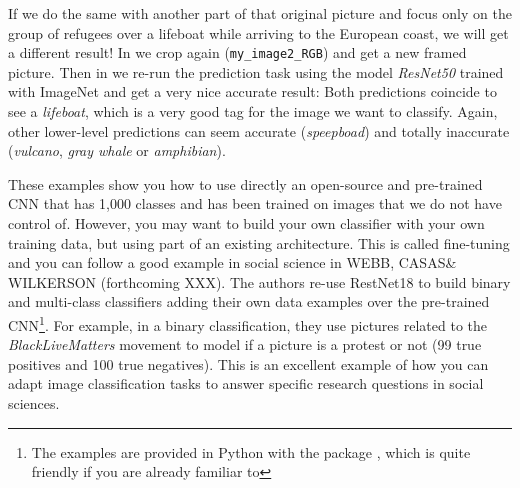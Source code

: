 If we do the same with another part of that original picture and focus only on the  group of refugees over a lifeboat while arriving to the European coast, we will get a different result! In  we crop again (\texttt{my\_image2\_RGB}) and get a new framed picture. Then in  we re-run the prediction task using the model \textit{ResNet50} trained with ImageNet and get a very nice accurate result: Both predictions coincide to see a \textit{lifeboat}, which is a very good tag for the image we want to classify. Again, other lower-level predictions can seem accurate (\textit{speepboad}) and totally inaccurate (\textit{vulcano}, \textit{gray whale} or \textit{amphibian}).



These examples show you how to use directly an open-source and pre-trained CNN that has 1,000 classes and has been trained on images that we do not have control of. However, you may want to build your own classifier with your own training data, but using part of an existing architecture. This is called fine-tuning and you can follow a good example in social science in WEBB, CASAS\& WILKERSON (forthcoming XXX). The authors re-use RestNet18 to build binary and multi-class classifiers adding their own data examples over the pre-trained CNN\footnote{The examples are provided in Python with the package , which is quite friendly if you are already familiar to  }. For example, in a binary classification, they use pictures related to the \textit{BlackLiveMatters} movement to model if a picture is a protest or not (99 true positives and 100 true negatives). This is an excellent example of how you can adapt image classification tasks to answer specific research questions in social sciences.